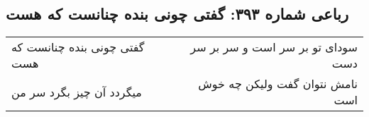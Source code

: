 \begin{center}
\section*{رباعی شماره ۳۹۳: گفتی چونی بنده چنانست که هست}
\label{sec:0393}
\begin{longtable}{l p{0.5cm} r}
گفتی چونی بنده چنانست که هست
&&
سودای تو بر سر است و سر بر سر دست
\\
میگردد آن چیز بگرد سر من
&&
نامش نتوان گفت ولیکن چه خوش است
\\
\end{longtable}
\end{center}
